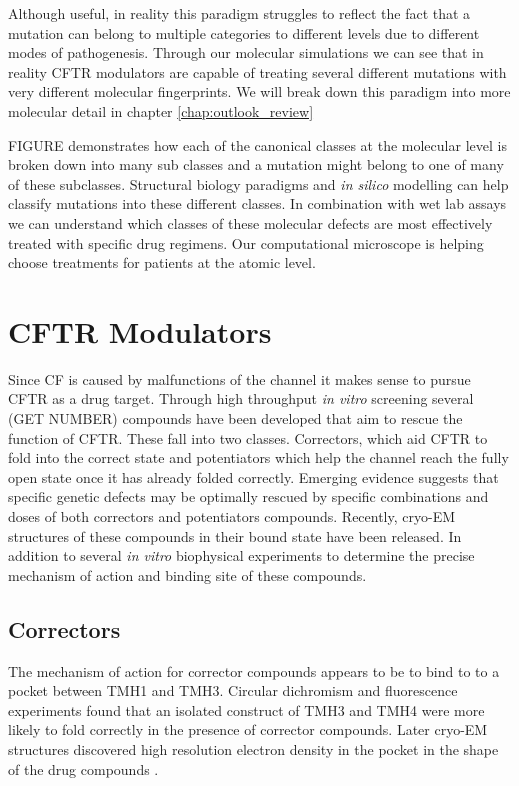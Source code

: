Although useful, in reality this paradigm struggles to reflect the fact that a mutation can belong to multiple categories to different levels due to different modes of pathogenesis. Through our molecular simulations we can see that in reality CFTR modulators are capable of treating several different mutations with very different molecular fingerprints. We will break down this paradigm into more molecular detail in chapter \ref{chap:outlook_review}

FIGURE demonstrates how each of the canonical classes at the molecular level is broken down into many sub classes and a mutation might belong to one of many of these subclasses. Structural biology paradigms and \textit{in silico} modelling can help classify mutations into these different classes. In combination with wet lab assays we can understand which classes of these molecular defects are most effectively treated with specific drug regimens. Our computational microscope is helping choose treatments for patients at the atomic level. 

\section{CFTR Modulators}
Since CF is caused by malfunctions of the channel it makes sense to pursue CFTR as a drug target. Through high throughput \textit{in vitro} screening several (GET NUMBER) compounds have been developed that aim to rescue the function of CFTR. These fall into two classes. Correctors, which aid CFTR to fold into the correct state and potentiators which help the channel reach the fully open state once it has already folded correctly. Emerging evidence suggests that specific genetic defects may be optimally rescued by specific combinations and doses of both correctors and potentiators compounds. Recently, cryo-EM structures of these compounds in their bound state have been released. In addition to several \textit {in vitro} biophysical experiments to determine the precise mechanism of action and binding site of these compounds.

\subsection{Correctors}
The mechanism of action for corrector compounds appears to be to bind to to a pocket between TMH1 and TMH3. Circular dichromism and fluorescence experiments found that an isolated construct of TMH3 and TMH4 were more likely to fold correctly in the presence of corrector compounds. Later cryo-EM structures discovered high resolution electron density in the pocket in the shape of the drug compounds \cite{fiedorczuk2022}. 

